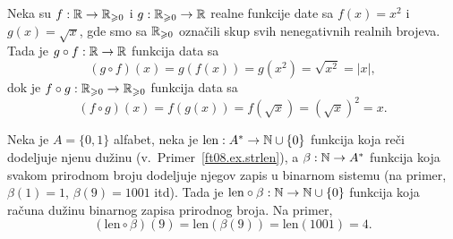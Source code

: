\medskip

\begin{EX}
  Neka su $f : \mathbb{R} \to \mathbb{R}_{\geqslant 0}$ i $g : \mathbb{R}_{\geqslant 0} \to \mathbb{R}$ realne funkcije date sa
  $f(x) = x^2$ i $g(x) = \sqrt x$, gde smo sa $\mathbb{R}_{\geqslant 0}$ ozna\v cili skup svih nenegativnih realnih brojeva.
  Tada je $g \circ f : \mathbb{R} \to \mathbb{R}$ funkcija data sa
  $$
    (g \circ f)(x) = g(f(x)) = g(x^2) = \sqrt{x^2} = |x|,
  $$
  dok je $f \circ g : \mathbb{R}_{\geqslant 0} \to \mathbb{R}_{\geqslant 0}$ funkcija data sa
  $$
    (f \circ g)(x) = f(g(x)) = f(\sqrt x) = (\sqrt{x})^2 = x.
  $$
\end{EX}

\begin{EX}
  Neka je $A = \{0, 1\}$ alfabet, neka je $\mathrm{len} : A^* \to \mathbb{N} \cup \{0\}$ funkcija koja re\v ci dodeljuje njenu
  du\v zinu (v.~Primer~\ref{ft08.ex.strlen}), a $\beta : \mathbb{N} \to A^*$ funkcija koja svakom prirodnom broju dodeljuje
  njegov zapis u binarnom sistemu (na primer, $\beta(1) = 1$, $\beta(9) = 1001$ itd). Tada je
  $\mathrm{len} \circ \beta : \mathbb{N} \to \mathbb{N} \cup \{0\}$ funkcija koja ra\v cuna du\v zinu binarnog zapisa prirodnog broja.
  Na primer,
  $$
    (\mathrm{len} \circ \beta)(9) = \mathrm{len}(\beta(9)) = \mathrm{len}(1001) = 4.
  $$
\end{EX}

  
%     

